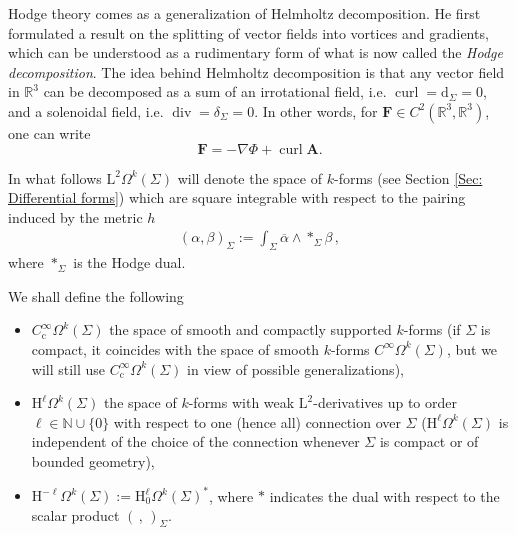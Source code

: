 Hodge theory comes as a generalization of Helmholtz decomposition. He first formulated a result on the splitting of vector fields into vortices and gradients, which can be understood as a rudimentary form of what is now called the \emph{Hodge decomposition}. The idea behind Helmholtz decomposition is that any vector field in $\mathbb{R}^3$ can be decomposed as a sum of an irrotational field, i.e. $\operatorname{curl}=\mathrm{d}_\Sigma=0$, and a solenoidal field, i.e. $\operatorname{div}=\delta_\Sigma=0$. In other words, for $\mathbf{F}\in C^2(\mathbb{R}^3,\mathbb{R}^3)$, one can write
\begin{equation}
\mathbf{F}=-\nabla\Phi+\operatorname{curl}\mathbf{A}.
\end{equation}


\noindent In what follows $\mathrm{L}^2\Omega^k(\Sigma)$ will denote the space of $k$-forms (see Section \ref{Sec: Differential forms}) which are square integrable with respect to the pairing induced by the metric $h$
\begin{align}\label{Eqn: L2-scalar product}
	(\alpha,\beta)_\Sigma:=\int_\Sigma\overline{\alpha}\wedge\ast_\Sigma\beta\,,
\end{align}
where $\ast_\Sigma$ is the Hodge dual.
\begin{Definition}
	We shall define the following
	\begin{itemize}
	\item $C^\infty_{\mathrm{c}}\Omega^k(\Sigma)$ the space of smooth and compactly supported $k$-forms (if $\Sigma$ is compact, it coincides with the space of smooth $k$-forms $C^\infty\Omega^k(\Sigma)$, but we will still use $C^\infty_{\mathrm{c}}\Omega^k(\Sigma)$ in view of possible generalizations),
	\item $\mathrm{H}^\ell\Omega^k(\Sigma)$ the space of $k$-forms with weak $\mathrm{L}^2$-derivatives up to order $\ell\in\mathbb{N}\cup\{0\}$ with respect to one (hence all) connection over $\Sigma$ ($\mathrm{H}^\ell\Omega^k(\Sigma)$ is independent of the choice of the connection whenever $\Sigma$ is compact or of bounded geometry),
	\item $\mathrm{H}^{-\ell}\Omega^k(\Sigma):=\mathrm{H}_0^\ell\Omega^k(\Sigma)^*$, where $\ast$ indicates the dual with respect to the scalar product $(\,,\,)_\Sigma$.
	\end{itemize} 
\end{Definition}


